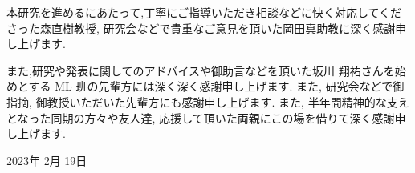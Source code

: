 \newpage
\changeindent{0cm}
\acknowledgements
\changeindent{2cm}


本研究を進めるにあたって,丁寧にご指導いただき相談などに快く対応してくださった森直樹教授, 研究会などで貴重なご意見を頂いた岡田真助教に深く感謝申し上げます.

また,研究や発表に関してのアドバイスや御助言などを頂いた坂川 翔祐さんを始めとする ML 班の先輩方には深く深く感謝申し上げます. また, 研究会などで御指摘, 御教授いただいた先輩方にも感謝申し上げます.
また, 半年間精神的な支えとなった同期の方々や友人達, 応援して頂いた両親にこの場を借りて深く感謝申し上げます.

\begin{flushright}
  2023年  2月  19日
\end{flushright}


